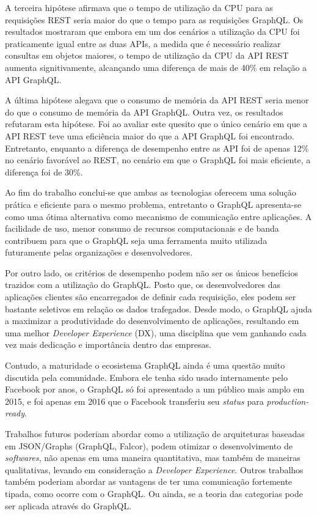 A terceira hipótese afirmava que o tempo de utilização da CPU para as requisições REST seria maior do que o tempo para as requisições GraphQL. Os resultados mostraram que embora em um dos cenários a utilização da CPU foi praticamente igual entre as duas APIs, a medida que é necessário realizar consultas em objetos maiores, o tempo de utilização da CPU da API REST aumenta signitivamente, alcançando uma diferença de mais de 40\% em relação a API GraphQL.

A última hipótese alegava que o consumo de memória da API REST seria menor do que o consumo de memória da API GraphQL. Outra vez, os resultados refutaram esta hipótese. Foi ao avaliar este quesito que o único cenário em que a API REST teve uma eficiência maior do que a API GraphQL foi encontrado. Entretanto, enquanto a diferença de desempenho entre as API foi de apenas 12\% no cenário favorável ao REST, no cenário em que o GraphQL foi mais eficiente, a diferença foi de 30\%. 

Ao fim do trabalho conclui-se que ambas as tecnologias oferecem uma solução prática e eficiente para o mesmo problema, entretanto o GraphQL apresenta-se como uma ótima alternativa como mecanismo de comunicação entre aplicações. A facilidade de uso, menor consumo de recursos computacionais e de banda contribuem para que o GraphQL seja uma ferramenta muito utilizada futuramente pelas organizações e desenvolvedores. 

Por outro lado, os critérios de desempenho podem não ser os únicos benefícios trazidos com a utilização do GraphQL. Posto que, os desenvolvedores das aplicações clientes são encarregados de definir cada requisição, eles podem ser bastante seletivos em relação os dados trafegados. Desde modo, o GraphQL ajuda a maximizar a produtividade do desenvolvimento de aplicações, resultando em uma melhor \textit{Developer Experience} (DX), uma disciplina que vem ganhando cada vez mais dedicação e importância dentro das empresas.

Contudo, a maturidade o ecosistema GraphQL ainda é uma questão muito discutida pela comunidade. Embora ele tenha sido usado internamente pelo Facebook por anos, o GraphQL só foi apresentado a um público mais amplo em 2015, e foi apenas em 2016 que o Facebook transferiu seu \textit{status} para \textit{production-ready}.

Trabalhos futuros poderiam abordar como a utilização de arquiteturas baseadas em JSON/Graphs (GraphQL, Falcor), podem otimizar o desenvolvimento de \textit{softwares}, não apenas em uma maneira quantitativa, mas também de maneiras qualitativas, levando em consideração a \textit{Developer Experience}. Outros trabalhos também poderiam abordar as vantagens de ter uma comunicação fortemente tipada, como ocorre com o GraphQL. Ou ainda, se a teoria das categorias pode ser aplicada através do GraphQL.
